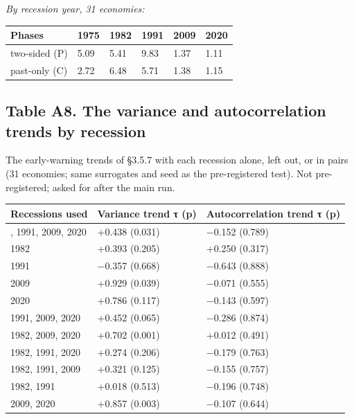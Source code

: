 \documentclass[11pt,a4paper]{article}
\newcounter{none}                    %
\begin{document}
\emph{By recession year, 31 economies:}

{\def\LTcaptype{none} %
\begin{longtable}[]{@{}llllll@{}}
\toprule\noalign{}
Phases & 1975 & 1982 & 1991 & 2009 & 2020 \\
\midrule\noalign{}
\endhead
\bottomrule\noalign{}
\endlastfoot
two-sided (P) & 5.09 & 5.41 & 9.83 & 1.37 & 1.11 \\
past-only (C) & 2.72 & 6.48 & 5.71 & 1.38 & 1.15 \\
\end{longtable}
}

\subsection{Table A8. The variance and autocorrelation trends by recession}\label{table-a8.-the-variance-and-autocorrelation-trends-by-recession}

The early-warning trends of §3.5.7 with each recession alone, left out, or in pairs (31 economies; same surrogates and seed as the pre-registered test). Not pre-registered; asked for after the main run.

{\def\LTcaptype{none} %
\begin{longtable}[]{@{}lll@{}}
\toprule\noalign{}
Recessions used & Variance trend τ (p) & Autocorrelation trend τ (p) \\
\midrule\noalign{}
\endhead
\bottomrule\noalign{}
\endlastfoot
1982, 1991, 2009, 2020 & +0.438 (0.031) & −0.152 (0.789) \\
1982 & +0.393 (0.205) & +0.250 (0.317) \\
1991 & −0.357 (0.668) & −0.643 (0.888) \\
2009 & +0.929 (0.039) & −0.071 (0.555) \\
2020 & +0.786 (0.117) & −0.143 (0.597) \\
1991, 2009, 2020 & +0.452 (0.065) & −0.286 (0.874) \\
1982, 2009, 2020 & +0.702 (0.001) & +0.012 (0.491) \\
1982, 1991, 2020 & +0.274 (0.206) & −0.179 (0.763) \\
1982, 1991, 2009 & +0.321 (0.125) & −0.155 (0.757) \\
1982, 1991 & +0.018 (0.513) & −0.196 (0.748) \\
2009, 2020 & +0.857 (0.003) & −0.107 (0.644) \\
\end{longtable}
}
\end{document}
